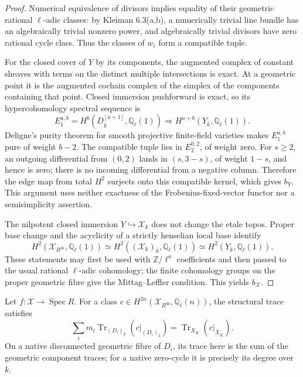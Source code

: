 \begin{proof}
Numerical equivalence of divisors implies equality of their geometric
rational $\ell$-adic classes: by Kleiman 6.3(a,b), a numerically
trivial line bundle has an algebraically trivial nonzero power, and
algebraically trivial divisors have zero rational cycle class.  Thus
the classes of $w_i$ form a compatible tuple.

For the closed cover of $Y$ by its components, the augmented complex
of constant sheaves with terms on the distinct multiple intersections
is exact.  At a geometric point it is the augmented cochain complex
of the simplex of the components containing that point.  Closed
immersion pushforward is exact, so its hypercohomology spectral
sequence is
\[
 E_1^{a,b}=H^b(D^{[a+1]}_{\bar k},\mathbb Q_\ell(1))
             \Longrightarrow H^{a+b}(Y_{\bar k},\mathbb Q_\ell(1)).
\tag{NL15}\label{r12n:cech}
\]
Deligne's purity theorem for smooth projective finite-field varieties
makes $E_1^{a,b}$ pure of weight $b-2$.  The compatible tuple lies in
$E_2^{0,2}$, of weight zero.  For $s\geq2$, an outgoing differential
from $(0,2)$ lands in $(s,3-s)$, of weight $1-s$, and hence is zero;
there is no incoming differential from a negative column.  Therefore
the edge map from total $H^2$ surjects onto this compatible kernel,
which gives $b_Y$.  This argument uses neither exactness of the
Frobenius-fixed-vector functor nor a semisimplicity assertion.

The nilpotent closed immersion $Y\hookrightarrow\mathcal X_k$
does not change the etale topos.  Proper base change and the
acyclicity of a strictly henselian local base identify
\[
 H^2(\mathcal X_{R^{\mathrm{sh}}},\mathbb Q_\ell(1))
       \simeq H^2((\mathcal X_k)_{\bar k},\mathbb Q_\ell(1))
       \simeq H^2(Y_{\bar k},\mathbb Q_\ell(1)).
\]
These statements may first be used with $\mathbb Z/\ell^a$ coefficients
and then passed to the usual rational $\ell$-adic cohomology; the
finite cohomology groups on the proper geometric fibre give the
Mittag--Leffler condition.  This yields $b_{\mathcal X}$.
\end{proof}

\begin{lemma}
\label{r12n:weighted-trace}
Let $f:\mathcal X\to\operatorname{Spec}R$.  For a class
$c\in H^{2n}(\mathcal X_{R^{\mathrm{sh}}},\mathbb Q_\ell(n))$,
the structural trace satisfies
\[
 \sum_i m_i\operatorname{Tr}_{(D_i)_{\bar k}}
                    (c|_{(D_i)_{\bar k}})
      =\operatorname{Tr}_{X_{\bar K}}(c|_{X_{\bar K}}).
\tag{NL16}\label{r12n:trace}
\]
On a native disconnected geometric fibre of $D_i$, its trace here
is the sum of the geometric component traces; for a native zero-cycle
it is precisely its degree over $k$.
\end{lemma}

